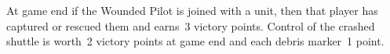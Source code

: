 \begin{scoring}  
\begin{primaries}

  At game end if the Wounded Pilot is joined with a unit, then that
  player has captured or rescued them and earns~3 victory points.
  Control of the crashed shuttle is worth~2 victory points at game end
  and each debris marker~1 point.


\end{primaries}
\end{scoring}

